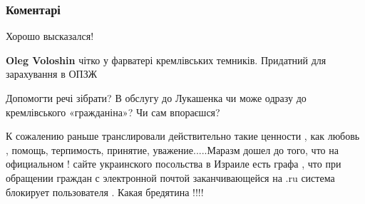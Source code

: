  
 
 
 
 
\subsubsection{Коментарі}
\label{sec:09_08_2021.fb.shevchenko_evgenij.1.vy_vse_raguli.cmt}

\begin{itemize}

Хорошо высказался!

\begin{itemize}
 

\textbf{Oleg Voloshin} чітко у фарватері кремлівських темників.
Придатний для зарахування в ОПЗЖ
\end{itemize}

 

Допомогти речі зібрати?
В обслугу до Лукашенка чи може одразу до кремлівського «гражданіна»?
Чи сам впораєшся?

 

К сожалению раньше транслировали действительно такие ценности , как любовь ,
помощь, терпимость, принятие, уважение.....Маразм дошел до того, что на
официальном ! сайте украинского посольства в Израиле есть графа , что при
обращении граждан с электронной почтой заканчивающейся на .ru система блокирует
пользователя . Какая бредятина !!!!


\end{itemize}
